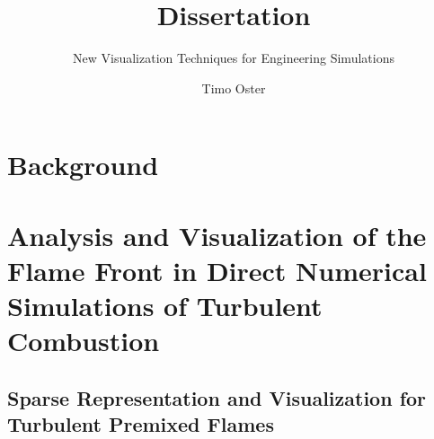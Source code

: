 \documentclass[BCOR=15mm, DIV=8]{scrbook}
\title{ Dissertation }
\subtitle{ New Visualization Techniques for Engineering Simulations }
\author{ Timo Oster }
\begin{document}

\frontmatter

\maketitle

\cleardoublepage
{}
\tableofcontents

\mainmatter



\part{Background} %
\label{part:background}






\part%
        {Analysis and Visualization of the Flame Front
         in Direct Numerical Simulations of Turbulent Combustion} %
\label{part:flame_vis}

\chapter[Sparse Representation for Turbulent Premixed Flames]
        {Sparse Representation and Visualization for Turbulent Premixed Flames} %
\label{cha:sparse_representation}
%
%







%
\end{document}
